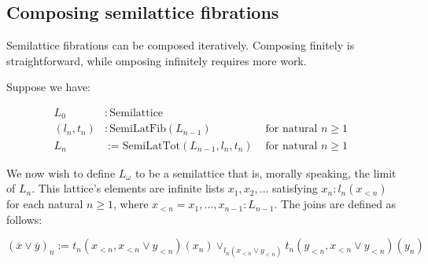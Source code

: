 \documentclass{article}
\begin{document}
    \subsection{Composing semilattice fibrations}

      Semilattice fibrations can be composed iteratively. Composing finitely is straightforward, while omposing infinitely requires more work.

      Suppose we have:

      \begin{align*}
        L_0 &: \mathrm{Semilattice} & \\
        (l_n, t_n) &: \mathrm{SemiLatFib}(L_{n-1}) & \text{ for natural $n \geq 1$ } \\
        L_n &:= \mathrm{SemiLatTot}(L_{n-1}, l_n, t_n)    & \text{ for natural $n \geq 1$ }
      \end{align*}

      We now wish to define $L_\omega$ to be a semilattice that is, morally speaking, the limit of $L_n$. This lattice's elements are infinite lists $x_1, x_2, \ldots$ satisfying $x_n : l_n(x_{<n})$ for each natural $n \geq 1$, where $x_{<n} = x_1, \ldots, x_{n-1} : L_{n-1}$. The joins are defined as follows:

      $$(\overline{x} \vee \overline{y})_n := t_n(x_{<n}, x_{<n} \vee y_{<n})(x_n) \vee_{l_n(x_{<n} \vee y_{<n})} t_n(y_{<n}, x_{<n} \vee y_{<n})(y_n)$$
\end{document}
